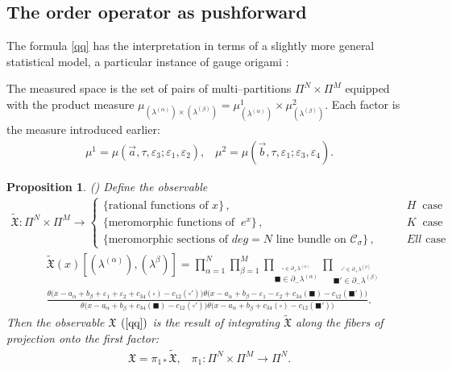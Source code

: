 \documentclass[12pt]{article}
\newtheorem{pr}{Proposition}[section]
\numberwithin{equation}{section}
\newcommand{\ve}{{\varepsilon}}
\theoremstyle{definition}
\begin{document}
\subsection{The order operator as pushforward}
The formula \eqref{qq} has the interpretation in terms of a slightly more general statistical model, a particular instance of gauge origami \cite{Nekrasov:2016ydq}:

The measured space is the set of pairs of multi--partitions $\Pi^{N} \times \Pi^{M}$ equipped with the product measure $\mu_{(\lambda^{(\alpha)}) \times (\lambda^{(\beta)})} = \mu^{1}_{(\lambda^{(\alpha)})} \times \mu^{2}_{(\lambda^{(\beta)})}$. Each factor is the measure introduced earlier:
\begin{align*}
    \mu^{1} =  \mu(\vec{a}, \tau, {\ve}_{3};\varepsilon_1 , \varepsilon_2 ),\;\;\;
    \mu^{2} =  \mu(\vec{b}, \tau, {\ve}_{1};\varepsilon_3 , \varepsilon_4 ).
\end{align*}

\begin{pr}
(\cite{Nekrasov2015BPSCFTCN}) Define the observable
\begin{align*}
\tilde{\mathfrak{X}}: \Pi^{N} \times \Pi^{M} \rightarrow \begin{cases} \{\text{rational functions of } x\} \, , \qquad & H \ \text{ case}\\
\{\text{meromorphic functions of } \ e^{x}\} \, , \qquad & K \ \text{ case}\\
\{\text{meromorphic sections of $deg = N$ line bundle on $\mathcal{C}_{\sigma}$}\} \, ,  \qquad & Ell \text{ case} \end{cases}
\end{align*}
\begin{align*}
  &\mathfrak{\tilde{X}}(x)[(\lambda^{(\alpha)}), (\lambda^{\beta})] =  \prod\limits_{\alpha = 1}^{N} \prod\limits_{\beta = 1}^{M}
  \prod\limits_{\stackrel{\square \in \partial_{+}\lambda^{(\alpha)}}{\blacksquare \in \partial_{-} \lambda^{(\alpha)}}}
   \prod\limits_{\stackrel{\square' \in \partial_{+}\lambda^{(\beta)}}{\blacksquare' \in \partial_{-} \lambda^{(\beta)}}}\\
   &\frac{\theta\big(x - a_{\alpha} + b_{\beta} + \varepsilon_{1} + \varepsilon_{2} + c_{34}(\square) - c_{12}(\square')\big)\theta\big(x - a_{\alpha} + b_{\beta} - \varepsilon_1 - \varepsilon_2 + c_{34}(\blacksquare) - c_{12}(\blacksquare')\big)}{\theta\big(x - a_{\alpha} + b_{\beta} + c_{34}(\blacksquare) - c_{12}(\square')\big)\theta\big(x - a_{\alpha} + b_{\beta} + c_{34}(\square) - c_{12}(\blacksquare')\big)}.
\end{align*}
Then the observable $\mathfrak{X}$ $(\ref{qq})$ is the result of integrating $\tilde{\mathfrak{X}}$ along the fibers of projection onto the first factor:
\begin{align*}
  \mathfrak{X} = \pi_{1*}\tilde{\mathfrak{X}}, \;\;\; \pi_1 : \Pi^{N} \times \Pi^{M} \rightarrow \Pi^{N}.
\end{align*}
\end{pr}
\end{document}
